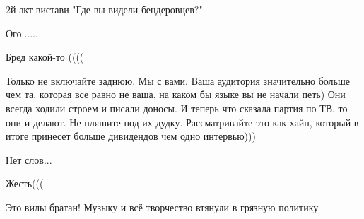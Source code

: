 \begin{itemize}
\begin{itemize}
2й акт вистави "Где вы видели бендеровцев?"
\end{itemize}

 
Ого......

 
Бред какой-то ((((

 

Только не включайте заднюю. Мы с вами. Ваша аудитория значительно больше чем
та, которая все равно не ваша, на каком бы языке вы не начали петь) Они всегда
ходили строем и писали доносы. И теперь что сказала партия по ТВ, то они и
делают. Не пляшите под их дудку. Рассматривайте это как хайп, который в итоге
принесет больше дивидендов чем одно интервью)))


 
Нет слов...

 
Жесть(((

 
Это вилы братан! Музыку и всё творчество втянули в грязную политику 🤬


\end{itemize}
